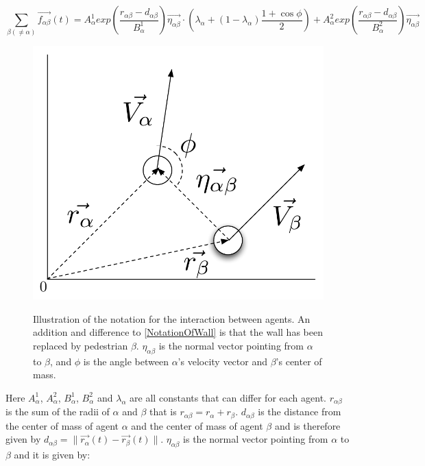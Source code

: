 \begin{equation}
    \sum_{\beta \left( \neq \alpha \right)}
        \vec{f_{\alpha \beta }}\left( t \right) =
        A_{\alpha}^{1} exp \left(
            \frac{ r_{\alpha \beta} - d_{\alpha \beta }}
                 {B_{\alpha}^1}
        \right)
    \vec{\eta_{\alpha \beta}} \cdot
    \left(
        \lambda_{\alpha} + \left(
            1 - \lambda_{\alpha}
        \right)
		\frac{1+\cos{\phi}}{2}
    \right) +
    A_{\alpha}^{2} exp\left(
        \frac{r_{\alpha \beta} - d_{\alpha \beta}}
             {B_{\alpha}^{2}}
    \right)
    \vec{\eta_{\alpha \beta}}
    \label{agentinteraction}
\end{equation}

\begin{figure}[ht]
    \centering
    {\includegraphics[scale=0.35]{Figures/NotationOfInteraction.pdf}} 
    \caption[Notation of the interaction between two agents]{Illustration of the notation for the interaction between agents.
	     An addition and difference to \ref{NotationOfWall} is that the wall has been replaced by pedestrian $\beta$.
	     $\eta_{\alpha \beta}$ is the normal vector pointing from $\alpha$ to $\beta$, and $\phi$ is the angle between $\alpha$'s 
	     velocity vector and $\beta$'s center of mass.}
    \label{NotationOfInteraction}
\end{figure}

Here $A_{\alpha}^{1}$, $A_{\alpha}^{2}$, $B_{\alpha}^{1}$, $B_{\alpha}^{2}$ 
and $\lambda_{\alpha}$ are all constants that can differ for each agent. 
$r_{\alpha \beta}$ is the sum of the radii of $\alpha$ and $\beta$ that is 
$r_{\alpha \beta} = r_{\alpha} + r_{\beta}$. $d_{\alpha \beta}$ is the 
distance from the center of mass of agent $\alpha$ and the center of mass of 
agent $\beta$ and is therefore given by $d_{\alpha \beta} = 
\|\vec{r_{\alpha}}\left( t \right) - \vec{r_{\beta}}\left( t \right) \|$.
$\eta_{\alpha \beta}$ is the normal vector pointing from $\alpha$ to $\beta$ 
and it is given by:

